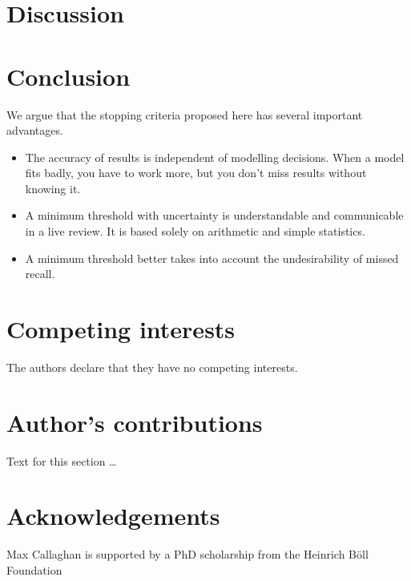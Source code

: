 \documentclass{bmcart}
\begin{document}
	
	
	
	
	\section*{Discussion}
	
	\section*{Conclusion}
	
	We argue that the stopping criteria proposed here has several important advantages.
	
	\begin{itemize}
		\item The accuracy of results is independent of modelling decisions. When a model fits badly, you have to work more, but you don't miss results without knowing it.
		\item A minimum threshold with uncertainty is understandable and communicable in a live review. It is based solely on arithmetic and simple statistics.
		\item A minimum threshold better takes into account the undesirability of missed recall.
	\end{itemize}
	
\begin{backmatter}
	
	\section*{Competing interests}
	The authors declare that they have no competing interests.
	
	\section*{Author's contributions}
	Text for this section \ldots
	
	\section*{Acknowledgements}
	Max Callaghan is supported by a PhD scholarship from the Heinrich Böll Foundation
		
	
	
	
\end{backmatter}
\end{document}
